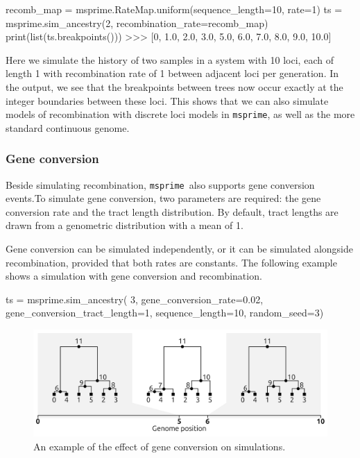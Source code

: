 \documentclass[graybox]{svmult}
\newcommand{\msprime}[0]{\texttt{msprime}}
\begin{document}
\begin{pythoncode}
recomb_map = msprime.RateMap.uniform(sequence_length=10, rate=1)
ts = msprime.sim_ancestry(2, recombination_rate=recomb_map)
print(list(ts.breakpoints()))
>>> [0, 1.0, 2.0, 3.0, 5.0, 6.0, 7.0, 8.0, 9.0, 10.0]
\end{pythoncode}

    Here we simulate the history of two samples in a system with 10 loci, each of
length 1 with recombination rate of 1 between adjacent loci per
generation. In the output, we see that the breakpoints between trees now
occur exactly at the integer boundaries between these loci. This shows that
we can also simulate models of recombination with discrete loci models
in \msprime, as well as the more standard continuous genome.

\subsubsection{Gene conversion}\label{gene-conversion}

Beside simulating recombination, \msprime\ also supports gene conversion events.To simulate gene conversion,
two parameters are required: the gene conversion rate and the tract length distribution. By default, tract lengths are drawn
from a genometric distribution with a mean of 1.

Gene conversion can be simulated independently, or it can be simulated alongside recombination, provided that both rates are constants.
The following example shows a simulation with gene conversion and recombination.

\begin{pythoncode}
ts = msprime.sim_ancestry(
    3, gene_conversion_rate=0.02, gene_conversion_tract_length=1,
    sequence_length=10, random_seed=3)
\end{pythoncode}

\begin{figure}
\begin{center}
\includegraphics[width=\textwidth]{images/gene_conversion.pdf}
\end{center}
\caption{\label{fig:gene_conversion} An example of the effect of gene conversion on simulations.}
\end{figure}
\end{document}

